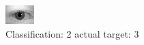 \begin{figure}[h!]
\begin{center}
\includegraphics[width=0.60\columnwidth]{figures/ID618_class_2_target_3.png}
\end{center}
\caption{ Classification: 2 actual target: 3}
\label{fig:ID618_class_2_target_3}
\end{figure}
